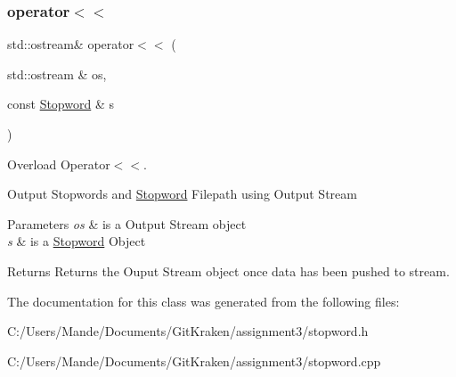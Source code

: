 \subsubsection{\texorpdfstring{operator$<$$<$}{operator<<}}
{\footnotesize\ttfamily std\+::ostream\& operator$<$$<$ (\begin{DoxyParamCaption}\item[{std\+::ostream \&}]{os,  }\item[{const \hyperlink{class_stopword}{Stopword} \&}]{s }\end{DoxyParamCaption})\hspace{0.3cm}{\ttfamily [friend]}}



Overload Operator$<$$<$. 

Output Stopwords and \hyperlink{class_stopword}{Stopword} Filepath using Output Stream


\begin{DoxyParams}{Parameters}
{\em os} & is a Output Stream object \\
\hline
{\em s} & is a \hyperlink{class_stopword}{Stopword} Object \\
\hline
\end{DoxyParams}
\begin{DoxyReturn}{Returns}
Returns the Ouput Stream object once data has been pushed to stream. 
\end{DoxyReturn}


The documentation for this class was generated from the following files\+:\begin{DoxyCompactItemize}
\item 
C\+:/\+Users/\+Mande/\+Documents/\+Git\+Kraken/assignment3/stopword.\+h\item 
C\+:/\+Users/\+Mande/\+Documents/\+Git\+Kraken/assignment3/stopword.\+cpp\end{DoxyCompactItemize}
